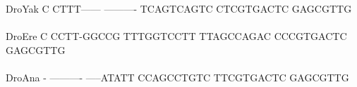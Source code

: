 \documentclass[11pt,twoside,reqno,a4paper]{article}
\begin{document}
{DroYak	C	CTTT------	----------	TCAGTCAGTC	CTCGTGACTC	GAGCGTTG\\
\hspace*{7\charwidth}\hspace*{1\charwidth}\hspace*{1\charwidth}\hspace*{1\charwidth}\hspace*{1\charwidth}\hspace*{1\charwidth}\\
DroEre	C	CCTT-GGCCG	TTTGGTCCTT	TTAGCCAGAC	CCCGTGACTC	GAGCGTTG\\
\hspace*{7\charwidth}\hspace*{1\charwidth}\hspace*{1\charwidth}\hspace*{1\charwidth}\hspace*{1\charwidth}\hspace*{1\charwidth}\\
DroAna	-	----------	-----ATATT	CCAGCCTGTC	TTCGTGACTC	GAGCGTTG\\
\hspace*{7\charwidth}\hspace*{1\charwidth}\hspace*{1\charwidth}\hspace*{1\charwidth}\hspace*{1\charwidth}\hspace*{1\charwidth}\\
\\
}
\end{document}

